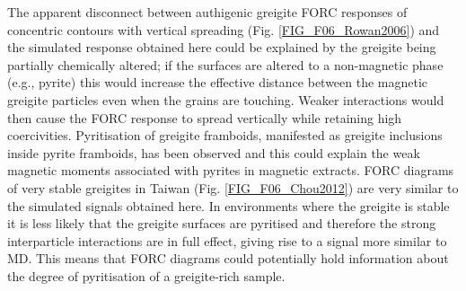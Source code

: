 The apparent disconnect between authigenic greigite FORC responses of concentric contours with vertical spreading (Fig. \ref{FIG_F06_Rowan2006}) and the simulated response obtained here could be explained by the greigite being partially chemically altered; if the surfaces are altered to a non-magnetic phase (e.g., pyrite) this would increase the effective distance between the magnetic greigite particles even when the grains are touching. Weaker interactions would then cause the FORC response to spread vertically while retaining high coercivities. Pyritisation of greigite framboids, manifested as greigite inclusions inside pyrite framboids, has been observed \citep{Ebert2018} and this could explain the weak magnetic moments associated with pyrites in magnetic extracts. FORC diagrams of very stable greigites in Taiwan (Fig. \ref{FIG_F06_Chou2012}) are very similar to the simulated signals obtained here. In environments where the greigite is stable it is less likely that the greigite surfaces are pyritised and therefore the strong interparticle interactions are in full effect, giving rise to a signal more similar to MD. This means that FORC diagrams could potentially hold information about the degree of pyritisation of a greigite-rich sample.\par

%
%
